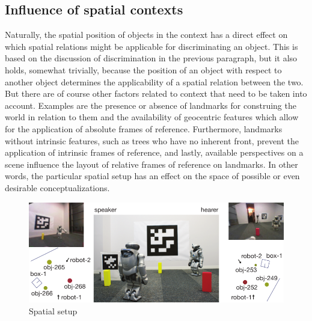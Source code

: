 \subsection{Influence of spatial contexts}
Naturally, the spatial position of objects in the context has a
direct effect on which spatial relations might be applicable for
discriminating an object. This is based on
the discussion of discrimination in the previous paragraph, 
but it also holds, somewhat trivially, because the position of an 
object with respect to another object determines the applicability 
of a spatial relation between the two. But there are of course other factors
related to context that need to be taken into account.
Examples are the presence or absence of landmarks for construing the world
in relation to them and the availability of geocentric
features which allow for the application of absolute frames of 
reference. Furthermore, landmarks without intrinsic features, such 
as trees who have no inherent front, 
prevent the application of intrinsic frames of reference, and lastly, available perspectives on a scene influence the layout
of relative frames of reference on landmarks. In other words,
the particular spatial setup has an effect on the 
space of possible or even desirable conceptualizations.

\begin{figure}
\begin{centering}
\includegraphics[width=1\columnwidth]{figs/space-scene-2-small}
\end{centering}
\caption[Spatial setup example]
{Spatial setup}
\label{f:space-scene-2}
\end{figure}


